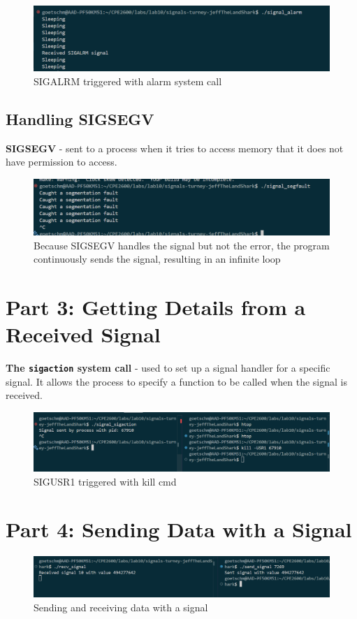 \documentclass{assignment}
\begin{document}
\begin{figure}
    \centering
    \includegraphics[width=1\linewidth]{images/SIGALRM.png}
    \caption{SIGALRM triggered with alarm system call}
\end{figure}

\subsection{Handling SIGSEGV}

\textbf{SIGSEGV} - sent to a process when it tries to access memory that it does not have permission to access.

\begin{figure}
    \centering
    \includegraphics[width=1\linewidth]{images/SIGSEGV.png}
    \caption{Because SIGSEGV handles the signal but not the error, the program continuously sends the signal, resulting in an infinite loop}
\end{figure}

\section{Part 3: Getting Details from a Received Signal}

\textbf{The \verb|sigaction| system call} - used to set up a signal handler for a specific signal. It allows the process to specify a function to be called when the signal is received.

\begin{figure}
    \centering
    \includegraphics[width=1\linewidth]{images/SIGUSR1.png}
    \caption{SIGUSR1 triggered with kill cmd}
\end{figure}

\section{Part 4: Sending Data with a Signal}

\begin{figure}
    \centering
    \includegraphics[width=1\linewidth]{images/sendrecv.png}
    \caption{Sending and receiving data with a signal}
\end{figure}



\end{document}
